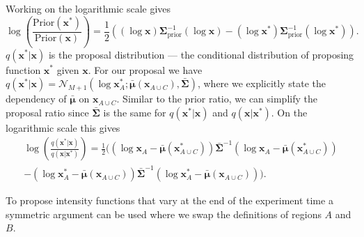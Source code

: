 \documentclass[oneside, 12 pt]{book}
\begin{document}
Working on the logarithmic scale gives
\begin{equation*}
	\log \left(\frac{\mathrm{Prior}(\mathbf{x}^*)}{\mathrm{Prior}(\mathbf{x})} \right) =  \frac{1}{2}\left( (\log \mathbf{x}) \boldsymbol{\Sigma}_\mathrm{prior} ^{-1} (\log \mathbf{x}) - (\log \mathbf{x}^*) \boldsymbol{\Sigma}_\mathrm{prior} ^{-1} (\log \mathbf{x}^*)\right).
\end{equation*}
       $q(\mathbf{x}^*|\mathbf{x})$ is the proposal distribution --- the conditional distribution of proposing function $\mathbf{x}^*$ given $\mathbf{x}$. For our proposal we have $q(\mathbf{x}^*|\mathbf{x}) = \mathcal{N}_{M+1}(\log \mathbf{x}_A^* ; \boldsymbol{\bar \mu}(\mathbf{x}_{A\cup C}), \boldsymbol {\bar \Sigma})$, where we explicitly state the dependency of $\boldsymbol{\bar \mu}$ on $\mathbf{x}_{A\cup C}$. Similar to the prior ratio, we can simplify the proposal ratio since $\boldsymbol{\bar \Sigma}$ is the same for $q(\mathbf{x}^*|\mathbf{x})$ and $q(\mathbf{x}|\mathbf{x}^*)$. On the logarithmic scale this gives
     \begin{multline} \label{eq:qratio}
	\log \left(\frac{q(\mathbf{x}^* | \mathbf{x})}{q(\mathbf{x} | \mathbf{x}^*)}\right) =  \frac{1}{2}\bigg( (\log \mathbf{x}_{A} - \boldsymbol{\bar\mu}(\mathbf{x}^*_{A\cup C})) \boldsymbol{\bar \Sigma} ^{-1} (\log \mathbf{x}_{A}  - \boldsymbol{\bar\mu}(\mathbf{x}^*_{A\cup C}))  \\ - (\log \mathbf{x}^*_{A} - \boldsymbol{\bar\mu}(\mathbf{x}_{A\cup C}))  \boldsymbol{\bar \Sigma} ^{-1} (\log \mathbf{x}^*_{A} - \boldsymbol{\bar\mu}(\mathbf{x}_{A\cup C}))\bigg).
\end{multline}  

To propose intensity functions that vary at the end of the experiment time a symmetric argument can be used where we swap the definitions of regions $A$ and $B$. 
\end{document}
